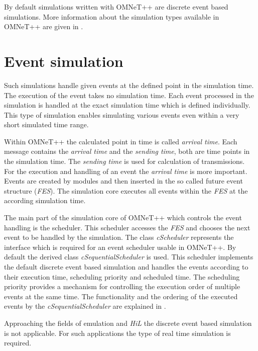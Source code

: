 By default simulations written with OMNeT++ are discrete event based simulations.
More information about the simulation types available in OMNeT++ are given in \cite[section 4.1]{omnet_manual}.

\section{Event simulation}
\label{sec:simulation_event}
Such simulations handle given events at the defined point in the simulation time.
The execution of the event takes no simulation time.
Each event processed in the simulation is handled at the exact simulation time which is defined individually.
This type of simulation enables simulating various events even within a very short simulated time range.

Within OMNeT++ the calculated point in time is called \emph{arrival time}.
Each message contains the \emph{arrival time} and the \emph{sending time}, both are time points in the simulation time.
The \emph{sending time} is used for calculation of transmissions.
For the execution and handling of an event the \emph{arrival time} is more important.
Events are created by modules and then inserted in the so called future event structure (\emph{FES}).
The simulation core executes all events within the \emph{FES} at the according simulation time.

The main part of the simulation core of OMNeT++ which controls the event handling is the scheduler.
This scheduler accesses the \emph{FES} and chooses the next event to be handled by the simulation.
The class \emph{cScheduler} represents the interface which is required for an event scheduler usable in OMNeT++.
By default the derived class \emph{cSequentialScheduler} is used.
This scheduler implements the default discrete event based simulation and handles the events according to their execution time, scheduling priority and scheduled time.
The scheduling priority provides a mechanism for controlling the execution order of multiple events at the same time.
The functionality and the ordering of the executed events by the \emph{cSequentialScheduler} are explained in \cite[section 4.1]{omnet_manual}.

Approaching the fields of emulation and \emph{HiL} the discrete event based simulation is not applicable.
For such applications the type of real time simulation is required.


